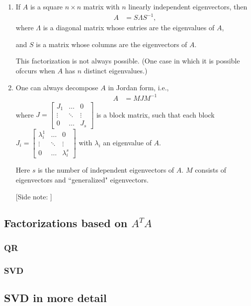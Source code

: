 \begin{enumerate}
\item If $A$ is a square $n\times n$ matrix with $n$ linearly independent eigenvectors, then
    \begin{align*}
        A &= S\Lambda S^{-1},
    \end{align*}
    where $\Lambda$ is a diagonal matrix whose entries are the eigenvalues of $A$,
    
    \medskip
    
    and $S$ is a matrix whose columns are the eigenvectors of $A$.
    
    \medskip
    
    This factorization is not always possible. (One case in which it is possible ofccurs when $A$ has $n$ distinct eigenvalues.)

\item One can always decompose $A$ in Jordan form, i.e.,
    \begin{align*}
        A &= MJM^{-1}
    \end{align*}
    where $J = 
    \begin{bmatrix}
        J_1 & \dots & 0 \\
        \vdots & \ddots & \vdots \\
        0 & \dots & J_s
    \end{bmatrix}
    $ is a block matrix, such that each block \newline
    $J_i = 
    \begin{bmatrix}
        \lambda_i^1 & \dots & 0 \\
        \vdots & \ddots & \vdots \\
        0 & \dots & \lambda_i^s
    \end{bmatrix}
    $ with $\lambda_i$ an eigenvalue of $A$.

    \medskip
    
    Here $s$ is the number of independent eigenvectors of $A$. $M$ consists of eigenvectors and ``generalized" eigenvectors.

    \medskip
    
    [Side note: ]

\end{enumerate}

\subsection{Factorizations based on $A^TA$}

\subsubsection{QR}

\subsubsection{SVD}

\subsection{SVD in more detail}